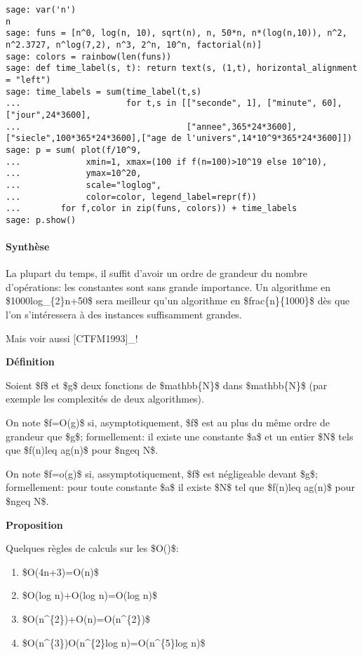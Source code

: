 \begin{verbatim}
sage: var('n')
n
sage: funs = [n^0, log(n, 10), sqrt(n), n, 50*n, n*(log(n,10)), n^2, n^2.3727, n^log(7,2), n^3, 2^n, 10^n, factorial(n)]
sage: colors = rainbow(len(funs))
sage: def time_label(s, t): return text(s, (1,t), horizontal_alignment = "left")
sage: time_labels = sum(time_label(t,s)
...                     for t,s in [["seconde", 1], ["minute", 60], ["jour",24*3600], 
...                                 ["annee",365*24*3600], ["siecle",100*365*24*3600],["age de l'univers",14*10^9*365*24*3600]])
sage: p = sum( plot(f/10^9,
...             xmin=1, xmax=(100 if f(n=100)>10^19 else 10^10),
...             ymax=10^20,
...             scale="loglog",
...             color=color, legend_label=repr(f))
...        for f,color in zip(funs, colors)) + time_labels
sage: p.show()
\end{verbatim}

\paragraph{Synthèse}

La plupart du temps, il suffit d'avoir un ordre de grandeur du nombre
d'opérations: les constantes sont sans grande importance. Un algorithme
en \$1000log\_\{2\}n+50\$ sera meilleur qu'un algorithme en
\$frac\{n\}\{1000\}\$ dès que l'on s'intéressera à des instances
suffisamment grandes.

Mais voir aussi {[}CTFM1993{]}\_!

\textbf{Définition}

Soient \$f\$ et \$g\$ deux fonctions de \$mathbb\{N\}\$ dans
\$mathbb\{N\}\$ (par exemple les complexités de deux algorithmes).

On note \$f=O(g)\$ si, asymptotiquement, \$f\$ est au plus du même ordre
de grandeur que \$g\$; formellement: il existe une constante \$a\$ et un
entier \$N\$ tels que \$f(n)leq ag(n)\$ pour \$ngeq N\$.

On note \$f=o(g)\$ si, assymptotiquement, \$f\$ est négligeable devant
\$g\$; formellement: pour toute constante \$a\$ il existe \$N\$ tel que
\$f(n)leq ag(n)\$ pour \$ngeq N\$.

\textbf{Proposition}

Quelques règles de calculs sur les \$O()\$:

\begin{enumerate}
\item
  \$O(4n+3)=O(n)\$
\item
  \$O(log n)+O(log n)=O(log n)\$
\item
  \$O(n\^{}\{2\})+O(n)=O(n\^{}\{2\})\$
\item
  \$O(n\^{}\{3\})O(n\^{}\{2\}log n)=O(n\^{}\{5\}log n)\$
\end{enumerate}

